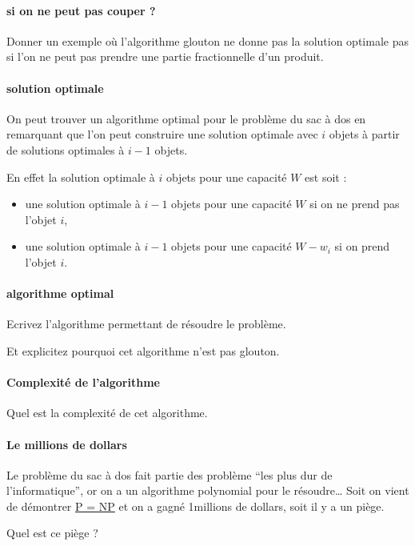 \documentclass[
]{article}
\providecommand{\tightlist}{%
  \setlength{\itemsep}{0pt}\setlength{\parskip}{0pt}}
\begin{document}
\hypertarget{si-on-ne-peut-pas-couper}{%
\paragraph{si on ne peut pas couper ?}\label{si-on-ne-peut-pas-couper}}

Donner un exemple où l'algorithme glouton ne donne pas la solution
optimale pas si l'on ne peut pas prendre une partie fractionnelle d'un
produit.

\hypertarget{solution-optimale}{%
\paragraph{solution optimale}\label{solution-optimale}}

On peut trouver un algorithme optimal pour le problème du sac à dos en
remarquant que l'on peut construire une solution optimale avec \(i\)
objets à partir de solutions optimales à \(i-1\) objets.

En effet la solution optimale à \(i\) objets pour une capacité \(W\) est
soit :

\begin{itemize}
\tightlist
\item
  une solution optimale à \(i-1\) objets pour une capacité \(W\) si on
  ne prend pas l'objet \(i\),
\item
  une solution optimale à \(i-1\) objets pour une capacité \(W - w_i\)
  si on prend l'objet \(i\).
\end{itemize}

\hypertarget{algorithme-optimal}{%
\paragraph{algorithme optimal}\label{algorithme-optimal}}

Ecrivez l'algorithme permettant de résoudre le problème.

Et explicitez pourquoi cet algorithme n'est pas glouton.

\hypertarget{complexituxe9-de-lalgorithme}{%
\paragraph{Complexité de
l'algorithme}\label{complexituxe9-de-lalgorithme}}

Quel est la complexité de cet algorithme.

\hypertarget{le-millions-de-dollars}{%
\paragraph{Le millions de dollars}\label{le-millions-de-dollars}}

Le problème du sac à dos fait partie des problème ``les plus dur de
l'informatique'', or on a un algorithme polynomial pour le
résoudre\ldots{} Soit on vient de démontrer
\href{https://fr.wikipedia.org/wiki/Probl\%C3\%A8mes_du_prix_du_mill\%C3\%A9naire\#Probl\%C3\%A8me_ouvert_P_=_NP}{P
= NP} et on a gagné 1millions de dollars, soit il y a un piège.

Quel est ce piège ?
\end{document}
